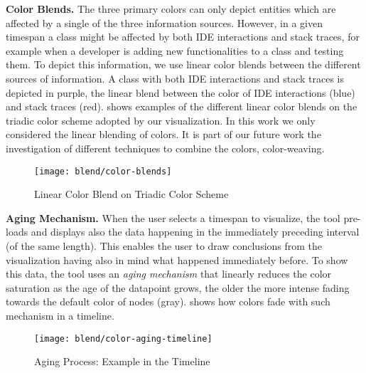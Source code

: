 {\bfseries Color Blends.} The three primary colors can only depict entities which are affected by a single of the three information sources.
However, in a given timespan a class might be affected by both IDE interactions and stack traces, for example when a developer is adding new functionalities to a class and testing them.
To depict this information, we use linear color blends between the different sources of information.
A class with both IDE interactions and stack traces is depicted in purple, the linear blend between the color of IDE interactions (\ie blue) and stack traces (\ie red).
 shows examples of the different linear color blends on the triadic color scheme adopted by our visualization.
In this work we only considered the linear blending of colors.
It is part of our future work the investigation of different techniques to combine the colors, \ie color-weaving.

\begin{figure}[ht]
\centering
\texttt{[image: blend/color-blends]}
\caption{Linear Color Blend on Triadic Color Scheme}
\label{fig:color-blends}
\end{figure}


{\bfseries Aging Mechanism.} When the user selects a timespan to visualize, the tool pre-loads and displays also the data happening in the immediately preceding interval (of the same length).
This enables the user to draw conclusions from the visualization having also in mind what happened immediately before.
To show this data, the tool uses an \emph{aging mechanism} that linearly reduces the color saturation as the age of the datapoint grows, \ie the older the more intense fading towards the default color of nodes (\ie gray).
 shows how colors fade with such mechanism in a timeline.

\begin{figure}[h!]
\centering
\texttt{[image: blend/color-aging-timeline]}
\caption{Aging Process: Example in the Timeline}
\label{fig:color-aging-timeline}
\end{figure}


